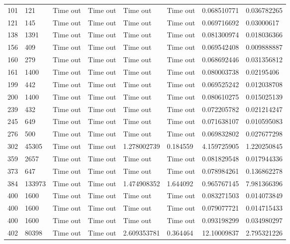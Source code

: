\begin{landscape}
\begin{longtabu} {|l|l|l|l|l|l|l|l|}
101       & 121     & Time out & Time out & Time out       & Time out & 0.068510771 & 0.036782265 \\
121       & 145     & Time out & Time out & Time out       & Time out & 0.069716692 & 0.03000617  \\
138       & 1391    & Time out & Time out & Time out       & Time out & 0.081300974 & 0.018036366 \\
156       & 409     & Time out & Time out & Time out       & Time out & 0.069542408 & 0.009888887 \\
160       & 279     & Time out & Time out & Time out       & Time out & 0.068692446 & 0.031356812 \\
161       & 1400    & Time out & Time out & Time out       & Time out & 0.080003738 & 0.02195406  \\
199       & 442     & Time out & Time out & Time out       & Time out & 0.069525242 & 0.012038708 \\
200       & 1400    & Time out & Time out & Time out       & Time out & 0.080610275 & 0.015025139 \\
239       & 432     & Time out & Time out & Time out       & Time out & 0.072205782 & 0.021214247 \\
245       & 649     & Time out & Time out & Time out       & Time out & 0.071638107 & 0.010595083 \\
276       & 500     & Time out & Time out & Time out       & Time out & 0.069832802 & 0.027677298 \\
302       & 45305   & Time out & Time out & 1.278002739    & 0.184559 & 4.159725905 & 1.220250845 \\
359       & 2657    & Time out & Time out & Time out       & Time out & 0.081829548 & 0.017944336 \\
373       & 647     & Time out & Time out & Time out       & Time out & 0.078984261 & 0.136862278 \\
384       & 133973  & Time out & Time out & 1.474908352    & 1.644092 & 0.965767145 & 7.981366396 \\
400       & 1600    & Time out & Time out & Time out       & Time out & 0.083271503 & 0.014073849 \\
400       & 1600    & Time out & Time out & Time out       & Time out & 0.079077721 & 0.014715433 \\
400       & 1600    & Time out & Time out & Time out       & Time out & 0.093198299 & 0.034980297 \\
402       & 80398   & Time out & Time out & 2.609353781    & 0.364464 & 12.10009837 & 2.795321226 \\

\end{longtabu}
\end{landscape}
